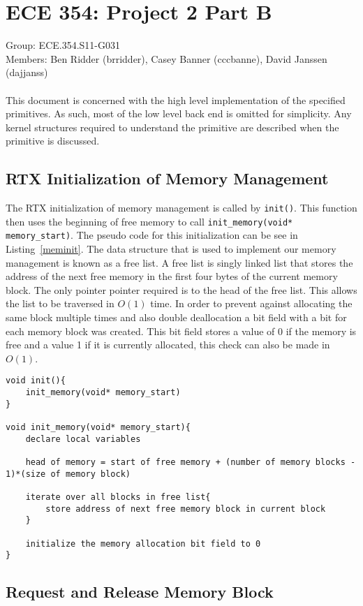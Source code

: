 \documentclass[oneside]{article}
\begin{document}
\lstset{language=C, frame=single, breaklines=true}
\section*{ECE 354: Project 2 Part B}
Group: ECE.354.S11-G031 \\
Members: Ben Ridder (brridder), Casey Banner (cccbanne), 
David Janssen (dajjanss) \\ \\
This document is concerned with the high level implementation of the 
specified primitives. As such, most of the low level back end is omitted for
simplicity. Any kernel structures required to understand the primitive are
described when the primitive is discussed.

\subsection*{RTX Initialization of Memory Management} 
The RTX initialization of memory management is called by \texttt{init()}.
This function then uses the beginning of free memory to call \texttt{init\_memory(void* memory\_start)}.
The pseudo code for this initialization can be see in Listing~\ref{meminit}. 
The data structure that is used to implement our memory management is known as a 
free list. A free list is singly linked list that stores the address of the next 
free memory in the first four bytes of the current memory block. The only pointer 
pointer required is to the head of the free list. This allows the list to be 
traversed in $O(1)$ time. In order to prevent against allocating the same block 
multiple times and also double deallocation a bit field with a bit for each memory 
block was created. This bit field stores a value of 0 if the memory is free and a 
value 1 if it is currently allocated, this check can also be made in $O(1)$. 

\begin{lstlisting}
void init(){
    init_memory(void* memory_start)
}

void init_memory(void* memory_start){
    declare local variables
    
    head of memory = start of free memory + (number of memory blocks - 1)*(size of memory block)

    iterate over all blocks in free list{
        store address of next free memory block in current block
    }

    initialize the memory allocation bit field to 0
}
\end{lstlisting}

\subsection*{Request and Release Memory Block}
\end{document}
